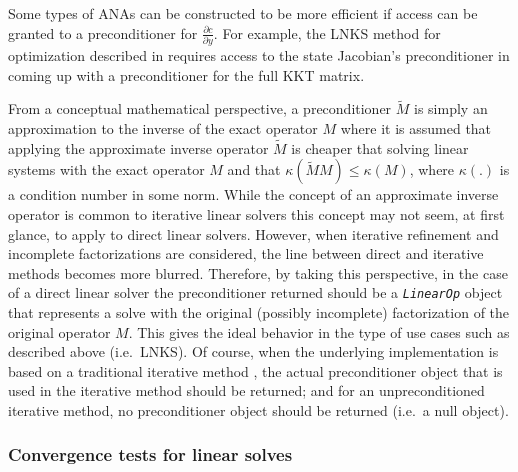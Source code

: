 Some types of ANAs can be constructed to be more efficient if access
can be granted to a preconditioner for $\frac{\partial c}{\partial
y}$.  For example, the LNKS method for optimization described in
\cite{GBiros_OGhattas_1_2000} requires access to the state Jacobian's
preconditioner in coming up with a preconditioner for the full KKT
matrix.

From a conceptual mathematical perspective, a preconditioner
$\tilde{M}$ is simply an approximation to the inverse of the exact
operator $M$ where it is assumed that applying the approximate inverse
operator $\tilde{M}$ is cheaper that solving linear systems with
the exact operator $M$ and that $\kappa(\tilde{M} M)
\le \kappa(M)$, where $\kappa(.)$ is a condition number in some norm.
While the concept of an approximate inverse operator is common to
iterative linear solvers this concept may not seem, at first glance,
to apply to direct linear solvers.  However, when iterative refinement
and incomplete factorizations are considered, the line between direct
and iterative methods becomes more blurred.  Therefore, by taking this
perspective, in the case of a direct linear solver the preconditioner
returned should be a \texttt{\textit{LinearOp}} object that represents
a solve with the original (possibly incomplete) factorization of the
original operator $M$.  This gives the ideal behavior in the type of
use cases such as described above (i.e.~LNKS).  Of course, when the
underlying implementation is based on a traditional iterative method
\cite{ref:tmpls_for_iter_systems}, the actual preconditioner object
that is used in the iterative method should be returned; and for an
unpreconditioned iterative method, no preconditioner object should be
returned (i.e.~a null object).

%
\subsubsection{Convergence tests for linear solves}
\label{tsfcorenonlin:sec:conv_tests}
%

